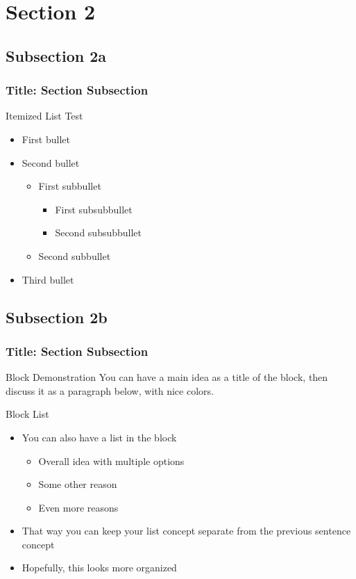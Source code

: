 \section{Section 2} %

\subsection{Subsection 2a}

\begin{frame}
\frametitle{Title: Section \thesection Subsection \thesubsection}
Itemized List Test
\begin{itemize}
    \item First bullet
    \item Second bullet
    \begin{itemize}
        \item First subbullet
        \begin{itemize}
            \item First subsubbullet
            \item Second subsubbullet
        \end{itemize}
        \item Second subbullet
    \end{itemize}
    \item Third bullet
\end{itemize}
\end{frame}


\subsection{Subsection 2b}

\begin{frame}
\frametitle{Title: Section \thesection Subsection \thesubsection}
\begin{block}{Block Demonstration}
You can have a main idea as a title of the block, then discuss it as a paragraph below, with nice colors.
\end{block}
\begin{block}{Block List}
    \begin{itemize}
      \item You can also have a list in the block
        \begin{itemize}
          \item Overall idea with multiple options
          \item Some other reason
          \item Even more reasons
        \end{itemize}
      \item That way you can keep your list concept separate from the previous sentence concept
      \item Hopefully, this looks more organized
    \end{itemize}
\end{block}
\end{frame}

